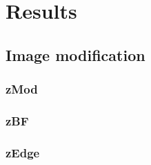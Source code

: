 
\chapter{Results}

\ifpdf
    \graphicspath{{Chapter5/Figs/Raster/}{Chapter5/Figs/PDF/}{Chapter5/Figs/}}
\else
    \graphicspath{{Chapter5/Figs/Vector/}{Chapter5/Figs/}}
\fi

\section{Image modification}

\subsection{zMod}



\subsection{zBF}



\subsection{zEdge}

